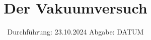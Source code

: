 

\subject{Versuch 70}
\title{Der Vakuumversuch}
\date{%
  Durchführung: 23.10.2024
  \hspace{3em}
  Abgabe: DATUM
}




\maketitle
\thispagestyle{empty}
\tableofcontents
\newpage







\printbibliography{}


